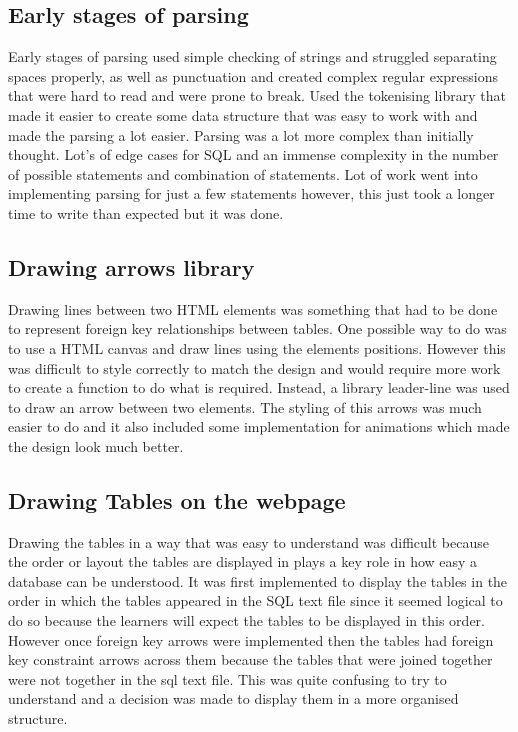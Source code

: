 
\subsection{Early stages of parsing}

Early stages of parsing used simple checking of strings and struggled separating spaces properly, as well as punctuation and created complex regular expressions that were hard to read and were prone to break. Used the tokenising library that made it easier to create some data structure that was easy to work with and made the parsing a lot easier. Parsing was a lot more complex than initially thought. Lot's of edge cases for SQL and an immense complexity in the number of possible statements and combination of statements. Lot of work went into implementing parsing for just a few statements however, this just took a longer time to write than expected but it was done.

\subsection{Drawing arrows library}

Drawing lines between two HTML elements was something that had to be done to represent foreign key relationships between tables. One possible way to do was to use a HTML canvas and draw lines using the elements positions. However this was difficult to style correctly to match the design and would require more work to create a function to do what is required. Instead, a library leader-line \cite{leader-line} was used to draw an arrow between two elements. The styling of this arrows was much easier to do and it also included some implementation for animations which made the design look much better.

\subsection{Drawing Tables on the webpage}

Drawing the tables in a way that was easy to understand was difficult because the order or layout the tables are displayed in plays a key role in how easy a database can be understood. It was first implemented to display the tables in the order in which the tables appeared in the SQL text file since it seemed logical to do so because the learners will expect the tables to be displayed in this order. However once foreign key arrows were implemented then the tables had foreign key constraint arrows across them because the tables that were joined together were not together in the sql text file. This was quite confusing to try to understand and a decision was made to display them in a more organised structure. 


